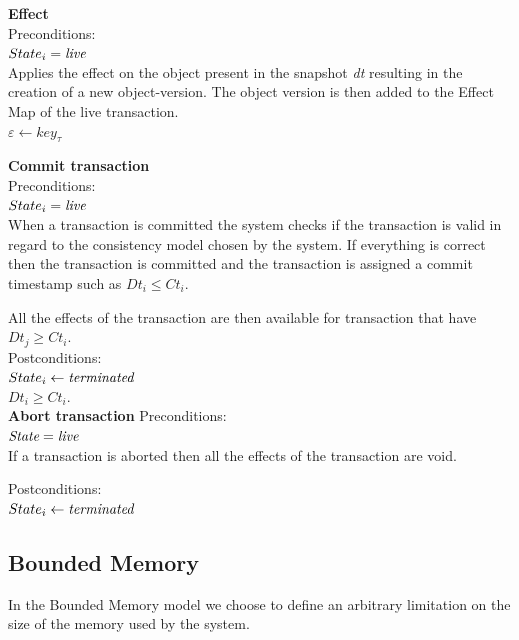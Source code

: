 \documentclass[systeme]{compas2022}
\begin{document}
\textbf{Effect}\\
Preconditions:\\ 
$State_i = \emph{live}$ \\

Applies the effect on the object present in the snapshot \emph{dt} resulting in the creation of a new object-version.
The object version is then added to the Effect Map of the live transaction.\\
$\varepsilon \leftarrow key_{\tau}$

\textbf{Commit transaction}\\
Preconditions:\\ 
$State_i = \emph{live}$ \\

When a transaction is committed the system checks if the transaction is valid in regard to the consistency model chosen by the system.
If everything is correct then the transaction is committed and the transaction is assigned a commit timestamp such as $Dt_i \leq Ct_i$.

All the effects of the transaction are then available for transaction that have $Dt_j \geq Ct_i$.\\

Postconditions:\\
$State_i \leftarrow \emph{terminated}$ \\
$Dt_i \geq Ct_i$.\\



\textbf{Abort transaction}
Preconditions:\\ 
$\emph{State} = \emph{live}$ \\

If a transaction is aborted then all the effects of the transaction are void.

Postconditions:\\
$State_i \leftarrow \emph{terminated}$ \\

\subsection{Bounded Memory}

In the Bounded Memory model we choose to define an arbitrary limitation on the size of the memory used by the system.
\end{document}
